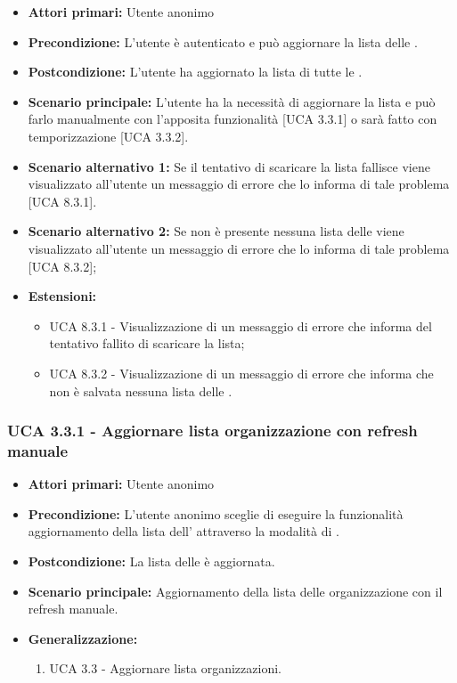 \begin{itemize} 
	\item \textbf{Attori primari:} Utente anonimo
	\item \textbf{Precondizione:} L'utente è autenticato e può aggiornare la lista delle .
	\item \textbf{Postcondizione:} L'utente ha aggiornato la lista di tutte le .
	\item \textbf{Scenario principale:} L'utente ha la necessità di aggiornare la lista e può farlo manualmente con l'apposita funzionalità [UCA 3.3.1] o sarà fatto con temporizzazione [UCA 3.3.2].
	\item \textbf{Scenario alternativo 1:} Se il tentativo di scaricare la lista fallisce viene visualizzato all'utente un messaggio di errore che lo informa di tale problema [UCA 8.3.1].
	\item \textbf{Scenario alternativo 2:} Se non è presente nessuna lista delle  viene visualizzato all'utente un messaggio di errore che lo informa di tale problema [UCA 8.3.2];
	\item \textbf{Estensioni:}
	\begin{itemize}
		\item UCA 8.3.1 - Visualizzazione di un messaggio di errore che informa del tentativo fallito di scaricare la lista;
		\item UCA 8.3.2 - Visualizzazione di un messaggio di errore che informa che non è salvata nessuna lista delle .
	\end{itemize}
\end{itemize}

\subsubsection{UCA 3.3.1 - Aggiornare lista organizzazione con refresh manuale}%
\begin{itemize}
	\item \textbf{Attori primari:} Utente anonimo
	\item \textbf{Precondizione:} L'utente anonimo sceglie di eseguire la funzionalità aggiornamento della lista dell' attraverso la modalità di .
	\item \textbf{Postcondizione:} La lista delle  è aggiornata.	
	\item \textbf{Scenario principale:} Aggiornamento della lista delle organizzazione con il refresh manuale.
	\item \textbf{Generalizzazione:}
	\begin{enumerate}
	\item UCA 3.3 - Aggiornare lista organizzazioni.
	\end{enumerate}
\end{itemize}

